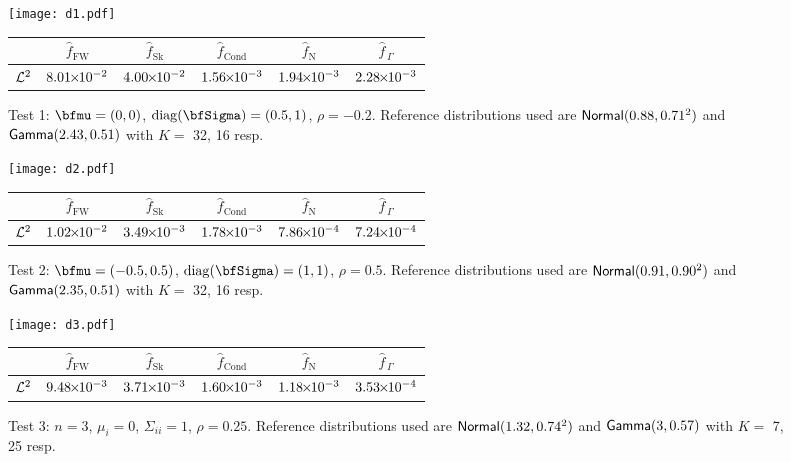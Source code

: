 \setlength\extrarowheight{3pt}

\begin{figure}[H]
\centering
\texttt{[image: d1.pdf]}

\vspace{4mm}

\begin{tabular}{c|c|c|c|c|c|}
\cline{2-6}
                         & $\widehat{f}_{\mathrm{FW}}$  & $\widehat{f}_{\mathrm{Sk}}$ & $\widehat{f}_{\mathrm{Cond}}$ & $\widehat{f}_{\mathrm{N}}$  & $\widehat{f}_{\,\Gamma}$ \\ \hline
\multicolumn{1}{|c|}{$\mathcal{L}^2$} & $8.01 {\mkern-2mu\times\mkern-2mu} 10^{-2}$ & $4.00 {\mkern-2mu\times\mkern-2mu} 10^{-2}$ & $1.56 {\mkern-2mu\times\mkern-2mu} 10^{-3}$ & $1.94 {\mkern-2mu\times\mkern-2mu} 10^{-3}$ & $2.28 {\mkern-2mu\times\mkern-2mu} 10^{-3}$ \\  \hline
\end{tabular}
\caption*{Test 1: $\bfmu = (0, 0)$, $\diag(\bfSigma) = (0.5, 1)$, $\rho = -0.2$. Reference distributions used are $\mathsf{Normal}(0.88,0.71^2)$ and $\mathsf{Gamma}(2.43,0.51)$ with $K =$ 32, 16 resp.}
\end{figure}


\begin{figure}[H]
\centering
\texttt{[image: d2.pdf]}

\vspace{4mm}

\begin{tabular}{c|c|c|c|c|c|}
\cline{2-6}
                         & $\widehat{f}_{\mathrm{FW}}$  & $\widehat{f}_{\mathrm{Sk}}$ & $\widehat{f}_{\mathrm{Cond}}$ & $\widehat{f}_{\mathrm{N}}$  & $\widehat{f}_{\,\Gamma}$ \\ \hline
\multicolumn{1}{|c|}{$\mathcal{L}^2$} & $1.02 {\mkern-2mu\times\mkern-2mu} 10^{-2}$ & $3.49 {\mkern-2mu\times\mkern-2mu} 10^{-3}$ & $1.78 {\mkern-2mu\times\mkern-2mu} 10^{-3}$ & $7.86 {\mkern-2mu\times\mkern-2mu} 10^{-4}$ & $7.24 {\mkern-2mu\times\mkern-2mu} 10^{-4}$ \\ \hline
\end{tabular}
\caption*{Test 2: $\bfmu = (-0.5, 0.5)$, $\diag(\bfSigma)= (1,1)$, $\rho = 0.5$. Reference distributions used are $\mathsf{Normal}(0.91,0.90^2)$ and $\mathsf{Gamma}(2.35,0.51)$ with $K =$ 32, 16 resp.}
\end{figure}

\begin{figure}[H]
\centering
\texttt{[image: d3.pdf]}

\vspace{4mm}

\begin{tabular}{c|c|c|c|c|c|}
\cline{2-6}
                         & $\widehat{f}_{\mathrm{FW}}$  & $\widehat{f}_{\mathrm{Sk}}$ & $\widehat{f}_{\mathrm{Cond}}$ & $\widehat{f}_{\mathrm{N}}$  & $\widehat{f}_{\,\Gamma}$ \\ \hline
\multicolumn{1}{|c|}{$\mathcal{L}^2$} & $9.48 {\mkern-2mu\times\mkern-2mu} 10^{-3}$ & $3.71 {\mkern-2mu\times\mkern-2mu} 10^{-3}$ & $1.60 {\mkern-2mu\times\mkern-2mu} 10^{-3}$ & $1.18 {\mkern-2mu\times\mkern-2mu} 10^{-3}$ & $3.53 {\mkern-2mu\times\mkern-2mu} 10^{-4}$ \\ \hline
\end{tabular}
\caption*{Test 3: $n=3$, $\mu_i = 0$, $\Sigma_{ii} = 1$, $\rho = 0.25$. Reference distributions used are $\mathsf{Normal}(1.32,0.74^2)$ and $\mathsf{Gamma}(3,0.57)$ with $K =$ 7, 25 resp.}
\end{figure}


